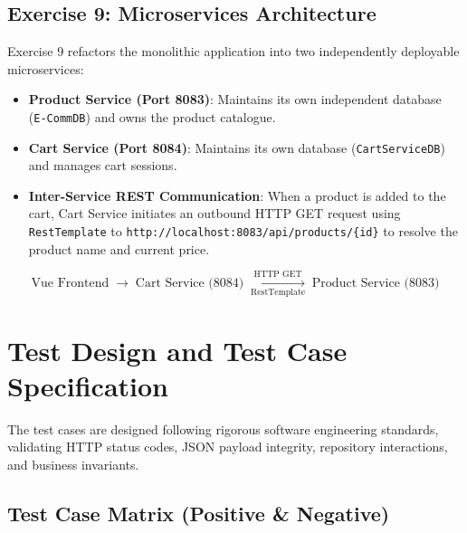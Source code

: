 \documentclass[12pt,a4paper]{article}
\begin{document}
\subsection{Exercise 9: Microservices Architecture}
Exercise 9 refactors the monolithic application into two independently deployable microservices:
\begin{itemize}[leftmargin=2em]
  \item \textbf{Product Service (Port 8083)}: Maintains its own independent database (\texttt{E-CommDB}) and owns the product catalogue.
  \item \textbf{Cart Service (Port 8084)}: Maintains its own database (\texttt{CartServiceDB}) and manages cart sessions.
  \item \textbf{Inter-Service REST Communication}: When a product is added to the cart, Cart Service initiates an outbound HTTP GET request using \texttt{RestTemplate} to \texttt{http://localhost:8083/api/products/\{id\}} to resolve the product name and current price.
\end{itemize}

\[
  \text{Vue Frontend} \;\longrightarrow\; \text{Cart Service (8084)} \;\xrightarrow[\text{RestTemplate}]{\text{HTTP GET}}\; \text{Product Service (8083)}
\]

\section{Test Design and Test Case Specification}

The test cases are designed following rigorous software engineering standards, validating HTTP status codes, JSON payload integrity, repository interactions, and business invariants.

\subsection{Test Case Matrix (Positive \& Negative)}
\end{document}
